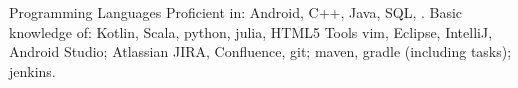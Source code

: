 \begin{cvskills}
  \cvskill
    {Programming Languages}
    {Proficient in: Android, C++, Java, SQL, \LaTeXe{}. 
       Basic knowledge of:
       Kotlin, Scala, python, julia, HTML5}
  \cvskill
  {Tools}
  {vim, Eclipse, IntelliJ, Android Studio;
   Atlassian JIRA, Confluence,
   git;
   maven, gradle (including tasks);
   jenkins.
  }


\end{cvskills}

